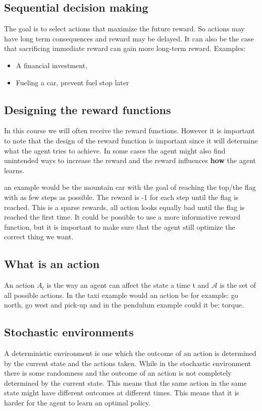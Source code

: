 \subsection*{Sequential decision making}
The goal is to select actions that maximize the future reward. So actions may have long term consequences and reward may be delayed. It can also be the case that sacrificing immediate reward can gain more long-term reward. Examples:

\begin{itemize}
	\item A financial investment,
	\item Fueling a car, prevent fuel stop later 
\end{itemize}

\subsection*{Designing the reward functions}
In this course we will often receive the reward functions. However it is important to note that the design of the reward function is important since it will determine what the agent tries to achieve. In some cases the agent might also find unintended ways to increase the reward and the reward influences \textbf{how} the agent learns. 

an example would be the mountain car with the goal of reaching the top/the flag with as few steps as possible. The reward is -1 for each step until the flag is reached. This is a sparse rewards, all action looks equally bad until the flag is reached the first time. It could be possible to use a more informative reward function, but it is important to make sure that the agent still optimize the correct thing we want. 


\subsection*{What is an action}
An action $A_t$ is the way an agent can affect the state a time t and $\mathcal{A}$ is the set of all possible actions. In the taxi example would an action be for example: go north, go west and pick-up and in the pendulum example could it be: torque.

\subsection*{Stochastic environments}
A deterministic environment is one which the outcome of an action is determined by the current state and the actions taken. While in the stochastic environment there is some randomness and the outcome of an action is not completely determined by the current state. This means that the same action in the same state might have different outcomes at different times. This means that it is harder for the agent to learn an optimal policy. 


